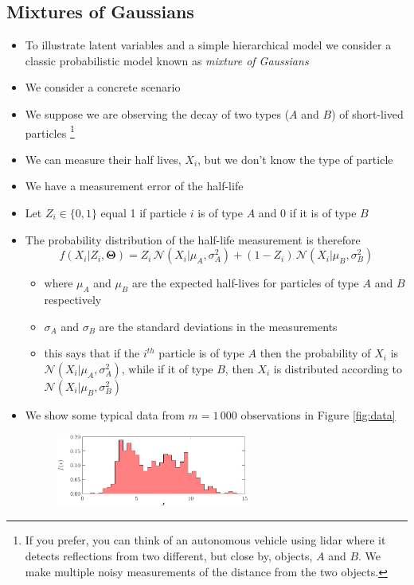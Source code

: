 \documentclass[11pt]{article}
\newcommand{\normal}[2]{\mathcal{N}\!\left(#1 \big| #2 \right)}
\begin{document}
\subsection{Mixtures of Gaussians}
\label{sec:org658f0df}
\begin{itemize}
\item To illustrate latent variables and a simple hierarchical model
we consider a classic probabilistic model known as \emph{mixture of Gaussians}
\item We consider a concrete scenario
\item We suppose we are observing the decay of two types (\(A\) and
\(B\)) of short-lived particles \footnote{If you prefer, you can think of an autonomous vehicle using lidar
where it detects reflections from two different, but close by,
objects, \(A\) and \(B\).  We make multiple noisy measurements of the distance
from the two objects.}
\item We can measure their half lives, \(X_i\), but we don't know the type
of particle
\item We have a measurement error of the half-life
\item Let \(Z_i \in \{0,1\}\) equal 1 if  particle \(i\) is of type \(A\)
and 0 if it is of type \(B\)
\item The probability distribution of the half-life measurement is
therefore
$$ f(X_i|Z_i,\bm{\Theta}) = Z_i\,\normal{X_i}{\mu_A,\sigma_A^2} +
        (1-Z_i)\,\normal{X_i}{\mu_B,\sigma_B^2} $$
\begin{itemize}
\item where \(\mu_A\) and \(\mu_B\) are the expected half-lives for
particles of type \(A\) and \(B\) respectively
\item \(\sigma_A\) and \(\sigma_B\) are the standard deviations in the measurements
\item this says that if the \(i^{th}\) particle is of type \(A\)
then the probability of \(X_i\) is
\(\normal{X_i}{\mu_A,\sigma_A^2}\), while if it of type \(B\),
then \(X_i\) is distributed according to \(\normal{X_i}{\mu_B,\sigma_B^2}\)
\end{itemize}
\item We show some typical data  from \(m=1\,000\) observations in
Figure \ref{fig:data}
\begin{figure}[htbp]
\centering
\includegraphics[width=0.6\textwidth]{./figures/mog-0.pdf}

\end{figure}
\end{itemize}
\end{document}
